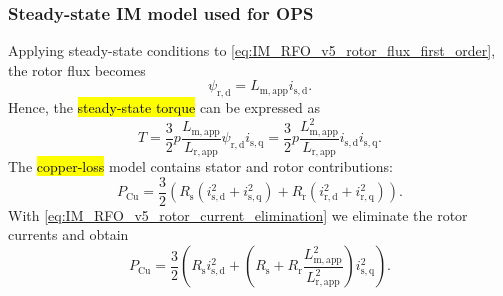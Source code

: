 \begin{frame}
    \frametitle{Steady-state IM model used for OPS}
    Applying steady-state conditions to \eqref{eq:IM_RFO_v5_rotor_flux_first_order}, the rotor flux becomes
    \begin{equation}
        \psi_{\mathrm{r,d}} = L_\mathrm{m,app} i_{\mathrm{s,d}}.
        \label{eq:steady-state_rotor_flux_IM_id}
    \end{equation}\pause%
    Hence, the \hl{steady-state torque} can be expressed as
    \begin{equation}
        T
        =\frac{3}{2}p\frac{L_{\mathrm{m,app}}}{L_{\mathrm{r,app}}}
        \psi_{\mathrm{r,d}} i_{\mathrm{s,q}}=\frac{3}{2}p\frac{L^2_{\mathrm{m,app}}}{L_{\mathrm{r,app}}}
        i_{\mathrm{s,d}}i_{\mathrm{s,q}}.
    \end{equation}\pause%
    The \hl{copper-loss} model contains stator and rotor contributions:
    \begin{equation}
        P_{\mathrm{Cu}}=\frac{3}{2}
        \left(
        R_{\mathrm s}\left(i^2_{\mathrm{s,d}}+i^2_{\mathrm{s,q}}\right)
        +R_{\mathrm r}\left(i^2_{\mathrm{r,d}}+i^2_{\mathrm{r,q}}\right)
        \right).
        \label{eq:IM_OPS_copper_losses}
    \end{equation}\pause%
    With \eqref{eq:IM_RFO_v5_rotor_current_elimination} we eliminate the rotor currents and obtain
    \begin{equation}
        P_{\mathrm{Cu}}=\frac{3}{2}
        \left(
        R_{\mathrm s}i^2_{\mathrm{s,d}}
        +\left(R_{\mathrm s}+R_{\mathrm r}\frac{L^2_{\mathrm{m,app}}}{L^2_{\mathrm{r,app}}}\right)i^2_{\mathrm{s,q}}
        \right).
        \label{eq:IM_OPS_copper_losses_stator_currents}
    \end{equation}
\end{frame}

